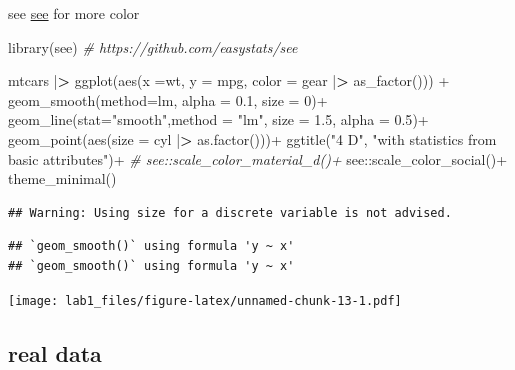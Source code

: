 \documentclass[
]{article}
\newenvironment{Shaded}{\begin{snugshade}}{\end{snugshade}}
\newcommand{\AttributeTok}[1]{\textcolor[rgb]{0.77,0.63,0.00}{#1}}
\newcommand{\CommentTok}[1]{\textcolor[rgb]{0.56,0.35,0.01}{\textit{#1}}}
\newcommand{\DecValTok}[1]{\textcolor[rgb]{0.00,0.00,0.81}{#1}}
\newcommand{\ErrorTok}[1]{\textcolor[rgb]{0.64,0.00,0.00}{\textbf{#1}}}
\newcommand{\FloatTok}[1]{\textcolor[rgb]{0.00,0.00,0.81}{#1}}
\newcommand{\FunctionTok}[1]{\textcolor[rgb]{0.00,0.00,0.00}{#1}}
\newcommand{\NormalTok}[1]{#1}
\newcommand{\SpecialCharTok}[1]{\textcolor[rgb]{0.00,0.00,0.00}{#1}}
\newcommand{\StringTok}[1]{\textcolor[rgb]{0.31,0.60,0.02}{#1}}
\begin{document}
see \href{https://github.com/easystats/see}{see} for more color

\begin{Shaded}
\begin{Highlighting}[]
\FunctionTok{library}\NormalTok{(see)}
\CommentTok{\# https://github.com/easystats/see}

\NormalTok{mtcars }\SpecialCharTok{|}\ErrorTok{\textgreater{}} 
\FunctionTok{ggplot}\NormalTok{(}\FunctionTok{aes}\NormalTok{(}\AttributeTok{x =}\NormalTok{wt, }\AttributeTok{y =}\NormalTok{ mpg, }
           \AttributeTok{color =}\NormalTok{ gear }\SpecialCharTok{|}\ErrorTok{\textgreater{}} \FunctionTok{as\_factor}\NormalTok{())) }\SpecialCharTok{+}
  \FunctionTok{geom\_smooth}\NormalTok{(}\AttributeTok{method=}\StringTok{\textquotesingle{}lm\textquotesingle{}}\NormalTok{, }\AttributeTok{alpha =} \FloatTok{0.1}\NormalTok{, }\AttributeTok{size =} \DecValTok{0}\NormalTok{)}\SpecialCharTok{+}
  \FunctionTok{geom\_line}\NormalTok{(}\AttributeTok{stat=}\StringTok{"smooth"}\NormalTok{,}\AttributeTok{method =} \StringTok{"lm"}\NormalTok{, }\AttributeTok{size  =} \FloatTok{1.5}\NormalTok{, }\AttributeTok{alpha =} \FloatTok{0.5}\NormalTok{)}\SpecialCharTok{+}
  \FunctionTok{geom\_point}\NormalTok{(}\FunctionTok{aes}\NormalTok{(}\AttributeTok{size =}\NormalTok{ cyl }\SpecialCharTok{|}\ErrorTok{\textgreater{}} \FunctionTok{as.factor}\NormalTok{()))}\SpecialCharTok{+}
  \FunctionTok{ggtitle}\NormalTok{(}\StringTok{"4 D"}\NormalTok{, }\StringTok{"with statistics from basic attributes"}\NormalTok{)}\SpecialCharTok{+}
  \CommentTok{\# see::scale\_color\_material\_d()+}
\NormalTok{  see}\SpecialCharTok{::}\FunctionTok{scale\_color\_social}\NormalTok{()}\SpecialCharTok{+}
  \FunctionTok{theme\_minimal}\NormalTok{()}
\end{Highlighting}
\end{Shaded}

\begin{verbatim}
## Warning: Using size for a discrete variable is not advised.
\end{verbatim}

\begin{verbatim}
## `geom_smooth()` using formula 'y ~ x'
## `geom_smooth()` using formula 'y ~ x'
\end{verbatim}

\texttt{[image: lab1\_files/figure-latex/unnamed-chunk-13-1.pdf]}

\hypertarget{real-data}{%
\subsection{real data}\label{real-data}}
\end{document}
